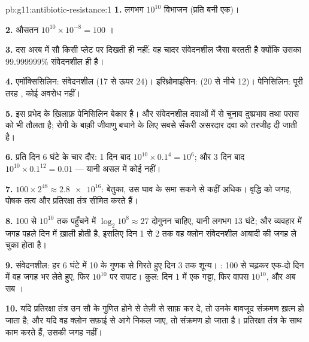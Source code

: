 \begin{solution}{pb:g11:antibiotic-resistance:1}
\textbf{1.} लगभग $10^{10}$ विभाजन (प्रति बनी  एक)।

\textbf{2.} औसतन $10^{10} \times 10^{-8} = 100$  ।

\textbf{3.} दस अरब में सौ  किसी प्लेट पर दिखती ही नहीं: वह चादर
संवेदनशील जैसा बरतती है क्योंकि उसका 99.999999\% संवेदनशील ही है।

\textbf{4.} एमॉक्सिसिलिन: संवेदनशील (17 से ऊपर 24)। इरिथ्रोमाइसिन:
 (20 से नीचे 12)। पेनिसिलिन: पूरी तरह , कोई अवरोध नहीं।

\textbf{5.} इस प्रभेद के ख़िलाफ़ पेनिसिलिन बेकार है। और संवेदनशील दवाओं में
से चुनाव दुष्प्रभाव तथा परास को भी तौलता है; रोगी के बाक़ी जीवाणु बचाने के
लिए सबसे सँकरी असरदार दवा को तरजीह दी जाती है।

\textbf{6.} प्रति दिन 6 घंटे के चार दौर: 1 दिन बाद $10^{10} \times 0.1^4 =
10^6$; और 3 दिन बाद $10^{10} \times 0.1^{12} = 0.01$ --- यानी असल में
कोई नहीं।

\textbf{7.} $100 \times 2^{48} \approx \num{2.8e16}$: बेतुका, उस घाव के
समा सकने से कहीं अधिक। वृद्धि को जगह, पोषक तत्व और प्रतिरक्षा तंत्र सीमित
करते हैं।

\textbf{8.} 100  से $10^{10}$ तक पहुँचने में $\log_2 10^8 \approx 27$
दोगुनन चाहिए, यानी लगभग 13 घंटे; और व्यवहार में जगह पहले दिन में ख़ाली
होती है, इसलिए दिन 1 से 2 तक वह  क्लोन संवेदनशील आबादी की जगह ले
चुका होता है।

\textbf{9.} संवेदनशील: हर 6 घंटे में 10 के गुणक से गिरते हुए दिन 3 तक
शून्य। : 100 से चढ़कर एक-दो दिन में वह जगह भर लेते हुए, फिर
$10^{10}$ पर सपाट। कुल: दिन 1 में एक गड्ढा, फिर वापस $10^{10}$, और अब सब
।

\textbf{10.} यदि प्रतिरक्षा तंत्र  उन सौ  के गुणित होने
से तेज़ी से साफ़ कर दे, तो उनके बावजूद संक्रमण ख़त्म हो जाता है; और यदि वह
क्लोन सफ़ाई से आगे निकल जाए, तो संक्रमण  हो जाता है। 
प्रतिरक्षा तंत्र के साथ काम करते हैं, उसकी जगह नहीं।


\end{solution}
